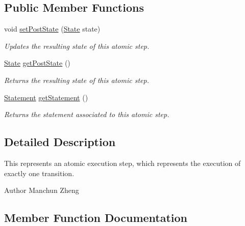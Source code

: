 \subsection*{Public Member Functions}
\begin{DoxyCompactItemize}
\item 
void \hyperlink{interfaceedu_1_1udel_1_1cis_1_1vsl_1_1civl_1_1kripke_1_1IF_1_1AtomicStep_a559b04f1977b61c5054a2cd7f358cd31}{set\+Post\+State} (\hyperlink{interfaceedu_1_1udel_1_1cis_1_1vsl_1_1civl_1_1state_1_1IF_1_1State}{State} state)
\begin{DoxyCompactList}\small\item\em Updates the resulting state of this atomic step. \end{DoxyCompactList}\item 
\hyperlink{interfaceedu_1_1udel_1_1cis_1_1vsl_1_1civl_1_1state_1_1IF_1_1State}{State} \hyperlink{interfaceedu_1_1udel_1_1cis_1_1vsl_1_1civl_1_1kripke_1_1IF_1_1AtomicStep_ae6fc545953da2cec242af89c9163aaf4}{get\+Post\+State} ()
\begin{DoxyCompactList}\small\item\em Returns the resulting state of this atomic step. \end{DoxyCompactList}\item 
\hyperlink{interfaceedu_1_1udel_1_1cis_1_1vsl_1_1civl_1_1model_1_1IF_1_1statement_1_1Statement}{Statement} \hyperlink{interfaceedu_1_1udel_1_1cis_1_1vsl_1_1civl_1_1kripke_1_1IF_1_1AtomicStep_a11d8a7fe77b7085a88e6981b7008e55c}{get\+Statement} ()
\begin{DoxyCompactList}\small\item\em Returns the statement associated to this atomic step. \end{DoxyCompactList}\end{DoxyCompactItemize}


\subsection{Detailed Description}
This represents an atomic execution step, which represents the execution of exactly one transition. 

\begin{DoxyAuthor}{Author}
Manchun Zheng 
\end{DoxyAuthor}


\subsection{Member Function Documentation}
\hypertarget{interfaceedu_1_1udel_1_1cis_1_1vsl_1_1civl_1_1kripke_1_1IF_1_1AtomicStep_ae6fc545953da2cec242af89c9163aaf4}{}
